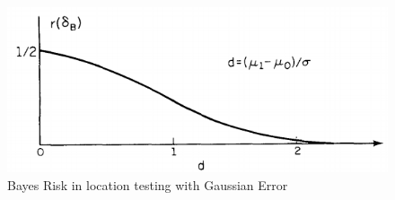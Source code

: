 \documentclass[12pt]{report}
\begin{document}
\begin{itemize}
\begin{exmp}
\begin{figure}[h]
\centering
\includegraphics[scale=0.7]{Figures/BayesRisk}
\caption{Bayes Risk in location testing with Gaussian Error}
\label{fig:BayesRisk}
\end{figure}





\end{exmp}
















\end{itemize}
\end{document}
